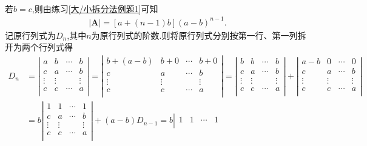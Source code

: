 \documentclass[lang=cn,newtx,10pt,scheme=chinese]{elegantbook}
\begin{document}
\begin{solution}
\begin{align*}
\nonumber
\end{align*}
若$b=c$,则由练习\ref{大/小拆分法例题1}可知
\begin{align*}
|\boldsymbol{A}|=\left[ a+\left( n-1 \right) b \right] \left( a-b \right) ^{n-1}.
\nonumber
\end{align*}
{\color{blue}}
记原行列式为$D_n$,其中$n$为原行列式的阶数.则将原行列式分别按第一行、第一列拆开为两个行列式得
\begin{align*}
D_n&=\left| \begin{matrix}
a&		b&		\cdots&		b\\
c&		a&		\cdots&		b\\
\vdots&		\vdots&		&		\vdots\\
c&		c&		\cdots&		a\\
\end{matrix} \right|=\left| \begin{matrix}
b+\left( a-b \right)&		b+0&		\cdots&		b+0\\
c&		a&		\cdots&		b\\
\vdots&		\vdots&		&		\vdots\\
c&		c&		\cdots&		a\\
\end{matrix} \right|=\left| \begin{matrix}
b&		b&		\cdots&		b\\
c&		a&		\cdots&		b\\
\vdots&		\vdots&		&		\vdots\\
c&		c&		\cdots&		a\\
\end{matrix} \right|+\left| \begin{matrix}
a-b&		0&		\cdots&		0\\
c&		a&		\cdots&		b\\
\vdots&		\vdots&		&		\vdots\\
c&		c&		\cdots&		a\\
\end{matrix} \right|
\\
&=b\left| \begin{matrix}
1&		1&		\cdots&		1\\
c&		a&		\cdots&		b\\
\vdots&		\vdots&		&		\vdots\\
c&		c&		\cdots&		a\\
\end{matrix} \right|+\left( a-b \right) D_{n-1}=b\left| \begin{matrix}
1&		1&		\cdots&		1\\

\end{matrix}
\end{align*}
\end{solution}
\end{document}

